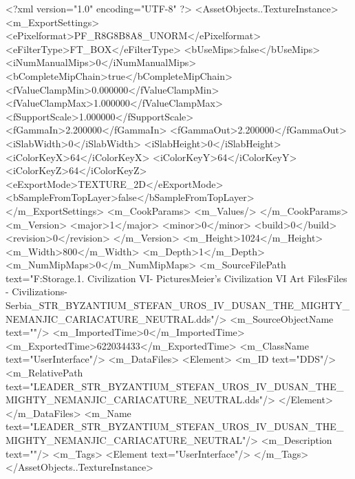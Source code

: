 <?xml version="1.0" encoding="UTF-8" ?>
<AssetObjects..TextureInstance>
	<m_ExportSettings>
		<ePixelformat>PF_R8G8B8A8_UNORM</ePixelformat>
		<eFilterType>FT_BOX</eFilterType>
		<bUseMips>false</bUseMips>
		<iNumManualMips>0</iNumManualMips>
		<bCompleteMipChain>true</bCompleteMipChain>
		<fValueClampMin>0.000000</fValueClampMin>
		<fValueClampMax>1.000000</fValueClampMax>
		<fSupportScale>1.000000</fSupportScale>
		<fGammaIn>2.200000</fGammaIn>
		<fGammaOut>2.200000</fGammaOut>
		<iSlabWidth>0</iSlabWidth>
		<iSlabHeight>0</iSlabHeight>
		<iColorKeyX>64</iColorKeyX>
		<iColorKeyY>64</iColorKeyY>
		<iColorKeyZ>64</iColorKeyZ>
		<eExportMode>TEXTURE_2D</eExportMode>
		<bSampleFromTopLayer>false</bSampleFromTopLayer>
	</m_ExportSettings>
	<m_CookParams>
		<m_Values/>
	</m_CookParams>
	<m_Version>
		<major>1</major>
		<minor>0</minor>
		<build>0</build>
		<revision>0</revision>
	</m_Version>
	<m_Height>1024</m_Height>
	<m_Width>800</m_Width>
	<m_Depth>1</m_Depth>
	<m_NumMipMaps>0</m_NumMipMaps>
	<m_SourceFilePath text="F:\Mod Storage\2.1. Civilization VI\Mods\Archive - Pictures\Sid Meier's Civilization VI Art Files\Art Files - Civilizations\Civilization - Serbia\LEADER_STR_BYZANTIUM_STEFAN_UROS_IV_DUSAN_THE_MIGHTY_NEMANJIC_CARIACATURE_NEUTRAL.dds"/>
	<m_SourceObjectName text=""/>
	<m_ImportedTime>0</m_ImportedTime>
	<m_ExportedTime>622034433</m_ExportedTime>
	<m_ClassName text="UserInterface"/>
	<m_DataFiles>
		<Element>
			<m_ID text="DDS"/>
			<m_RelativePath text="LEADER_STR_BYZANTIUM_STEFAN_UROS_IV_DUSAN_THE_MIGHTY_NEMANJIC_CARIACATURE_NEUTRAL.dds"/>
		</Element>
	</m_DataFiles>
	<m_Name text="LEADER_STR_BYZANTIUM_STEFAN_UROS_IV_DUSAN_THE_MIGHTY_NEMANJIC_CARIACATURE_NEUTRAL"/>
	<m_Description text=""/>
	<m_Tags>
		<Element text="UserInterface"/>
	</m_Tags>
</AssetObjects..TextureInstance>

